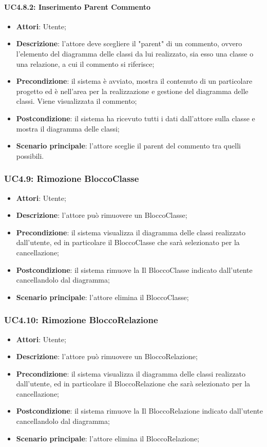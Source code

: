 \paragraph{UC4.8.2: Inserimento Parent Commento}
\label{UC4.8.2}
\begin{itemize}
	\item \textbf{Attori}: Utente;
	\item \textbf{Descrizione}: l'attore deve scegliere il "parent" di un commento, ovvero l'elemento del diagramma delle classi da lui realizzato, sia esso una classe o una relazione, a cui il commento si riferisce;
	\item \textbf{Precondizione}: il sistema è avviato, mostra il contenuto di un particolare progetto ed è nell'area per la realizzazione e gestione del diagramma delle classi. Viene visualizzata il commento;
	\item \textbf{Postcondizione}: il sistema ha ricevuto tutti i dati dall'attore sulla classe e mostra il diagramma delle classi;
	\item \textbf{Scenario principale}: l'attore sceglie il parent del commento tra quelli possibili.
\end{itemize}

\subsubsection{UC4.9: Rimozione BloccoClasse}
\label{UC4.9}
\begin{itemize}
	\item \textbf{Attori}: Utente;
	\item \textbf{Descrizione}: l'attore può rimuovere un BloccoClasse;
	\item \textbf{Precondizione}: il sistema visualizza il diagramma delle classi realizzato dall'utente, ed in particolare il BloccoClasse che sarà selezionato per la cancellazione;
	\item \textbf{Postcondizione}: il sistema rimuove la Il BloccoClasse indicato dall'utente cancellandolo dal diagramma;
	\item \textbf{Scenario principale}: l'attore elimina il BloccoClasse;
\end{itemize}

\subsubsection{UC4.10: Rimozione BloccoRelazione}
\label{UC4.10}
\begin{itemize}
	\item \textbf{Attori}: Utente;
	\item \textbf{Descrizione}: l'attore può rimuovere un BloccoRelazione;
	\item \textbf{Precondizione}: il sistema visualizza il diagramma delle classi realizzato dall'utente, ed in particolare il BloccoRelazione che sarà selezionato per la cancellazione;
	\item \textbf{Postcondizione}: il sistema rimuove la Il BloccoRelazione indicato dall'utente cancellandolo dal diagramma;
	\item \textbf{Scenario principale}: l'attore elimina il BloccoRelazione;
\end{itemize}

